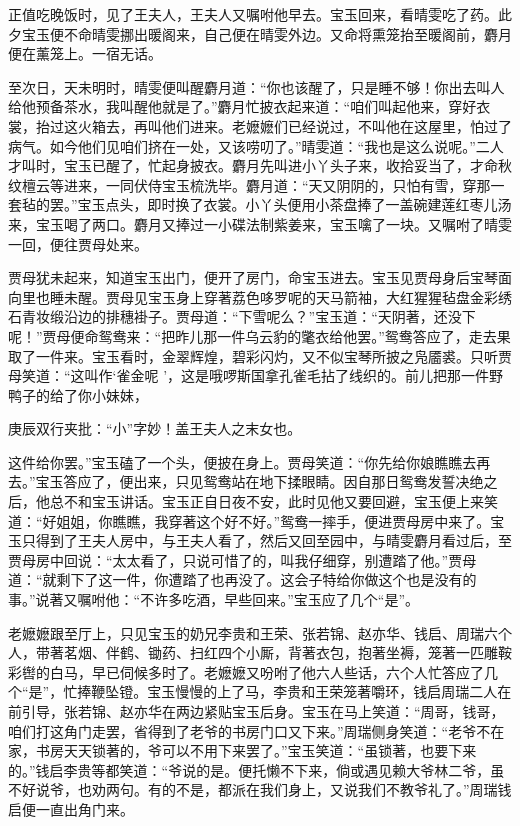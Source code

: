 \begin{parag}


    正值吃晚饭时，见了王夫人，王夫人又嘱咐他早去。宝玉回来，看晴雯吃了药。此夕宝玉便不命晴雯挪出暖阁来，自己便在晴雯外边。又命将熏笼抬至暖阁前，麝月便在薰笼上。一宿无话。
\end{parag}


\begin{parag}


    至次日，天未明时，晴雯便叫醒麝月道：“你也该醒了，只是睡不够！你出去叫人给他预备茶水，我叫醒他就是了。”麝月忙披衣起来道：“咱们叫起他来，穿好衣裳，抬过这火箱去，再叫他们进来。老嬷嬷们已经说过，不叫他在这屋里，怕过了病气。如今他们见咱们挤在一处，又该唠叨了。”晴雯道：“我也是这么说呢。”二人才叫时，宝玉已醒了，忙起身披衣。麝月先叫进小丫头子来，收拾妥当了，才命秋纹檀云等进来，一同伏侍宝玉梳洗毕。麝月道：“天又阴阴的，只怕有雪，穿那一套毡的罢。”宝玉点头，即时换了衣裳。小丫头便用小茶盘捧了一盖碗建莲红枣儿汤来，宝玉喝了两口。麝月又捧过一小碟法制紫姜来，宝玉噙了一块。又嘱咐了晴雯一回，便往贾母处来。
\end{parag}


\begin{parag}


    贾母犹未起来，知道宝玉出门，便开了房门，命宝玉进去。宝玉见贾母身后宝琴面向里也睡未醒。贾母见宝玉身上穿著荔色哆罗呢的天马箭袖，大红猩猩毡盘金彩绣石青妆缎沿边的排穗褂子。贾母道：“下雪呢么？”宝玉道：“天阴著，还没下呢！”贾母便命鸳鸯来：“把昨儿那一件乌云豹的氅衣给他罢。”鸳鸯答应了，走去果取了一件来。宝玉看时，金翠辉煌，碧彩闪灼，又不似宝琴所披之凫靥裘。只听贾母笑道：“这叫作‘雀金呢 ’，这是哦啰斯国拿孔雀毛拈了线织的。前儿把那一件野鸭子的给了你小妹妹，\begin{note}庚辰双行夹批：“小”字妙！盖王夫人之末女也。\end{note}这件给你罢。”宝玉磕了一个头，便披在身上。贾母笑道：“你先给你娘瞧瞧去再去。”宝玉答应了，便出来，只见鸳鸯站在地下揉眼睛。因自那日鸳鸯发誓决绝之后，他总不和宝玉讲话。宝玉正自日夜不安，此时见他又要回避，宝玉便上来笑道：“好姐姐，你瞧瞧，我穿著这个好不好。”鸳鸯一摔手，便进贾母房中来了。宝玉只得到了王夫人房中，与王夫人看了，然后又回至园中，与晴雯麝月看过后，至贾母房中回说：“太太看了，只说可惜了的，叫我仔细穿，别遭踏了他。”贾母道：“就剩下了这一件，你遭踏了也再没了。这会子特给你做这个也是没有的事。”说著又嘱咐他：“不许多吃酒，早些回来。”宝玉应了几个“是”。
\end{parag}


\begin{parag}


    老嬷嬷跟至厅上，只见宝玉的奶兄李贵和王荣、张若锦、赵亦华、钱启、周瑞六个人，带著茗烟、伴鹤、锄药、扫红四个小厮，背著衣包，抱著坐褥，笼著一匹雕鞍彩辔的白马，早已伺候多时了。老嬷嬷又吩咐了他六人些话，六个人忙答应了几个“是”，忙捧鞭坠镫。宝玉慢慢的上了马，李贵和王荣笼著嚼环，钱启周瑞二人在前引导，张若锦、赵亦华在两边紧贴宝玉后身。宝玉在马上笑道：“周哥，钱哥，咱们打这角门走罢，省得到了老爷的书房门口又下来。”周瑞侧身笑道：“老爷不在家，书房天天锁著的，爷可以不用下来罢了。”宝玉笑道：“虽锁著，也要下来的。”钱启李贵等都笑道：“爷说的是。便托懒不下来，倘或遇见赖大爷林二爷，虽不好说爷，也劝两句。有的不是，都派在我们身上，又说我们不教爷礼了。”周瑞钱启便一直出角门来。
\end{parag}


